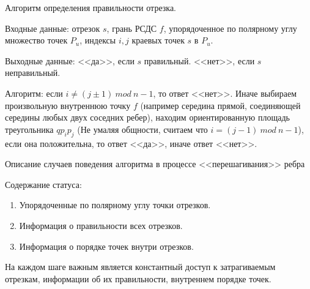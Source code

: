 \documentclass[letterpaper,12pt]{article}
\begin{document}
\begin{center}
      Алгоритм определения правильности отрезка.
\end{center}

Входные данные: отрезок $s$, грань РСДС $f$, упорядоченное по 
полярному углу множество точек $P_u$, индексы $i, j$ краевых точек $s$
в $P_u$.

Выходные данные: <<да>>, если $s$ правильный. <<нет>>, если $s$ 
неправильный.

Алгоритм: если $i \neq (j \pm 1) \ mod \ n-1$, то ответ <<нет>>. Иначе
выбираем произвольную внутреннюю точку $f$ (например середина прямой,
соединяющей середины любых двух соседних ребер), находим ориентированную
площадь треугольника $q p_i p_j$ (Не умаляя общности, считаем что
$i = (j - 1) \ mod \ n-1$), если она положительна, то ответ <<да>>, иначе
ответ <<нет>>.

\begin{center}
Описание случаев поведения алгоритма в процессе <<перешагивания>> ребра
\end{center}
Содержание статуса: 
\begin{enumerate}
      \item Упорядоченные по полярному углу точки отрезков.
      \item Информация о правильности всех отрезков.
      \item Информация о порядке точек внутри отрезков.
\end{enumerate}

На каждом шаге важным является константный доступ к затрагиваемым
отрезкам, информации об их правильности, внутреннем порядке точек.
\end{document}
